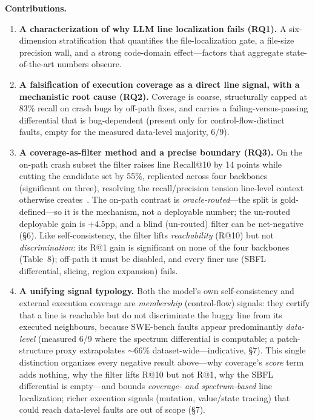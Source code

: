 \documentclass[11pt]{article}
\begin{document}
\noindent\textbf{Contributions.}
\begin{enumerate}[leftmargin=1.6em,topsep=2pt,itemsep=2pt]
  \item \textbf{A characterization of why LLM line localization fails (RQ1).} A six-dimension stratification that quantifies the file-localization gate, a file-size precision wall, and a strong code-domain effect---factors that aggregate state-of-the-art numbers obscure.
  \item \textbf{A falsification of execution coverage as a direct line signal, with a mechanistic root cause (RQ2).} Coverage is coarse, structurally capped at 83\% recall on crash bugs by off-path fixes, and carries a failing-versus-passing differential that is bug-dependent (present only for control-flow-distinct faults, empty for the measured data-level majority, 6/9).
  \item \textbf{A coverage-as-filter method and a precise boundary (RQ3).} On the on-path crash subset the filter raises line Recall@10 by 14 points while cutting the candidate set by 55\%, replicated across four backbones (significant on three), resolving the recall/precision tension line-level context otherwise creates~\citep{flcontext}. The on-path contrast is \emph{oracle-routed}---the split is gold-defined---so it is the mechanism, not a deployable number; the un-routed deployable gain is $+4.5$pp, and a blind (un-routed) filter can be net-negative (\S6). Like self-consistency, the filter lifts \emph{reachability} (R@10) but not \emph{discrimination}: its R@1 gain is significant on none of the four backbones (Table~8); off-path it must be disabled, and every finer use (SBFL differential, slicing, region expansion) fails.
  \item \textbf{A unifying signal typology.} Both the model's own self-consistency and external execution coverage are \emph{membership} (control-flow) signals: they certify that a line is reachable but do not discriminate the buggy line from its executed neighbours, because SWE-bench faults appear predominantly \emph{data-level} (measured 6/9 where the spectrum differential is computable; a patch-structure proxy extrapolates $\sim$66\% dataset-wide---indicative, \S7). This single distinction organizes every negative result above---why coverage's \emph{score} term adds nothing, why the filter lifts R@10 but not R@1, why the SBFL differential is empty---and bounds \emph{coverage- and spectrum-based} line localization; richer execution signals (mutation, value/state tracing) that could reach data-level faults are out of scope (\S7).
\end{enumerate}
\end{document}
